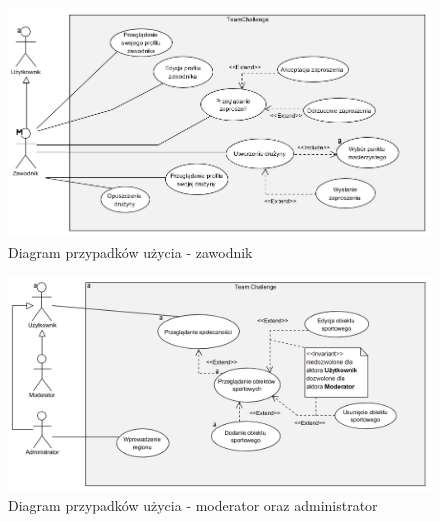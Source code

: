 \begin{figure}[H]
\centering
\includegraphics[width=\linewidth]{04-projekt/rys/usecase2.PNG}
\caption{Diagram przypadków użycia - zawodnik}
\label{fig:diagram-trad-alg-opt}
\end{figure}

\begin{figure}[H]
\centering
\includegraphics[width=\linewidth]{04-projekt/rys/usecase4.PNG}
\caption{Diagram przypadków użycia - moderator oraz administrator}
\label{fig:diagram-trad-alg-opt}
\end{figure}

